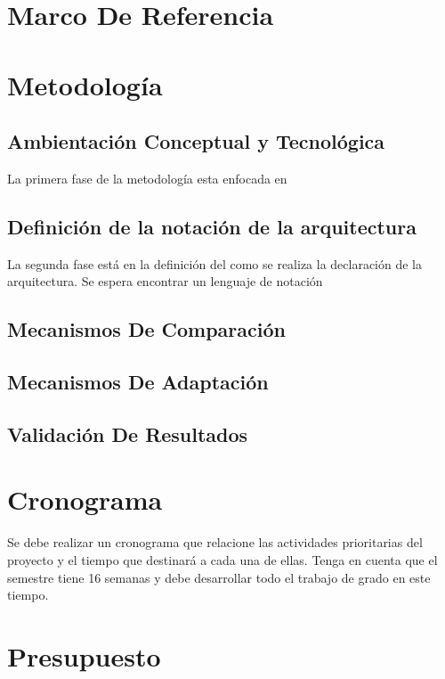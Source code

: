 \documentclass[12pt]{article}
\begin{document}
    \section{Marco De Referencia}

    \section{Metodología}

    \subsection{Ambientación Conceptual y Tecnológica}

    La primera fase de la metodología esta enfocada en 

    \subsection{Definición de la notación de la arquitectura}
    
    La segunda fase está en la definición del como se realiza la declaración de la arquitectura. Se espera encontrar un lenguaje de notación

    \subsection{Mecanismos De Comparación}


    \subsection{Mecanismos De Adaptación}
    

    \subsection{Validación De Resultados}


    \section{Cronograma}

    Se debe realizar un cronograma que relacione las actividades prioritarias del proyecto y el tiempo que destinará a cada una de ellas. Tenga en cuenta que el semestre tiene 16 semanas y debe desarrollar todo el trabajo de grado en este tiempo. 

    

    \section{Presupuesto}
\end{document}
